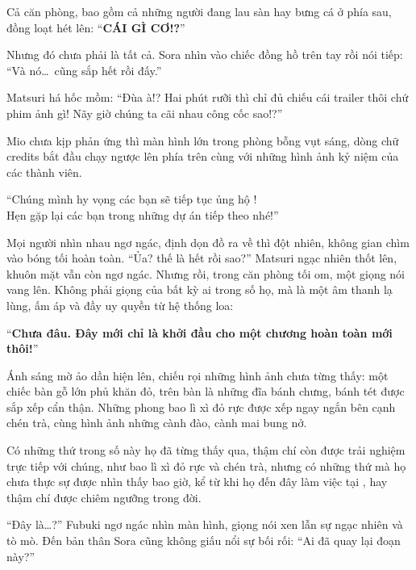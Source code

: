 \documentclass[../main.tex]{subfiles}
\begin{document}
Cả căn phòng, bao gồm cả những người đang lau sàn hay bưng cá ở phía sau, đồng loạt hét lên: ``\textbf{CÁI GÌ CƠ!?}''

Nhưng đó chưa phải là tất cả. Sora nhìn vào chiếc đồng hồ trên tay rồi nói tiếp: ``Và nó\dots\ cũng sắp hết rồi đấy.''


Matsuri há hốc mồm: ``Đùa à!? Hai phút rưỡi thì chỉ đủ chiếu cái trailer thôi chứ phim ảnh gì! Nãy giờ chúng ta cãi nhau công cốc sao!?''

Mio chưa kịp phản ứng thì màn hình lớn trong phòng bỗng vụt sáng, dòng chữ credits bắt đầu chạy ngược lên phía trên cùng với những hình ảnh kỷ niệm của các thành viên.


\begin{center}
  ``Chúng mình hy vọng các bạn sẽ tiếp tục ủng hộ \hll!\\
  Hẹn gặp lại các bạn trong những dự án tiếp theo nhé!''
\end{center}

Mọi người nhìn nhau ngơ ngác, định dọn đồ ra về thì đột nhiên, không gian chìm vào bóng tối hoàn toàn. ``Ủa? thế là hết rồi sao?'' Matsuri ngạc nhiên thốt lên, khuôn mặt vẫn còn ngơ ngác. Nhưng rồi, trong căn phòng tối om, một giọng nói vang lên. Không phải giọng của bất kỳ ai trong số họ, mà là một âm thanh lạ lùng, ấm áp và đầy uy quyền từ hệ thống loa:

\begin{center}
  ``\textbf{Chưa đâu. Đây mới chỉ là khởi đầu cho một chương hoàn toàn mới thôi!}''
\end{center}

Ánh sáng mờ ảo dần hiện lên, chiếu rọi những hình ảnh chưa từng thấy: một chiếc bàn gỗ lớn phủ khăn đỏ, trên bàn là những đĩa bánh chưng, bánh tét được sắp xếp cẩn thận. Những phong bao lì xì đỏ rực được xếp ngay ngắn bên cạnh chén trà, cùng hình ảnh những cành đào, cành mai bung nở.

Có những thứ trong số này họ đã từng thấy qua, thậm chí còn được trải nghiệm trực tiếp với chúng, như bao lì xì đỏ rực và chén trà, nhưng có những thứ mà họ chưa thực sự được nhìn thấy bao giờ, kể từ khi họ đến đây làm việc tại \hll, hay thậm chí được chiêm ngưỡng trong đời.

``Đây là\dots?'' Fubuki ngơ ngác nhìn màn hình, giọng nói xen lẫn sự ngạc nhiên và tò mò. Đến bản thân Sora cũng không giấu nổi sự bối rối: ``Ai đã quay lại đoạn này?''
\end{document}
